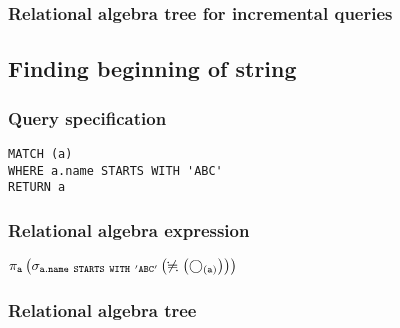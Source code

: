 \subsubsection*{Relational algebra tree for incremental queries}


\subsection{Finding beginning of string}

\subsubsection*{Query specification}

\begin{lstlisting}
MATCH (a)
WHERE a.name STARTS WITH 'ABC'
RETURN a
\end{lstlisting}

\subsubsection*{Relational algebra expression}

$\projection{\var{a}} \left(\selection{\mathtt{a.name~STARTS~WITH~'ABC'}} \left(\alldifferent{} \left(\getvertices{a}{}\right)\right)\right)$

\subsubsection*{Relational algebra tree}


